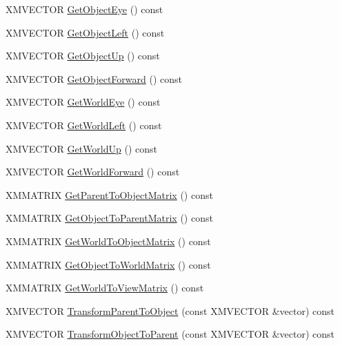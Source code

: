 \begin{DoxyCompactItemize}
\item 
X\+M\+V\+E\+C\+T\+OR \hyperlink{structmage_1_1_transform_ac6808d885014b98c6920f8a770d3c7d4}{Get\+Object\+Eye} () const
\item 
X\+M\+V\+E\+C\+T\+OR \hyperlink{structmage_1_1_transform_a12946ff32c7044889f7c89c9182dba76}{Get\+Object\+Left} () const
\item 
X\+M\+V\+E\+C\+T\+OR \hyperlink{structmage_1_1_transform_a68a9a599104b976b01aea39cc8ab03d2}{Get\+Object\+Up} () const
\item 
X\+M\+V\+E\+C\+T\+OR \hyperlink{structmage_1_1_transform_affc4bcfe6ca76005db8676de867aede0}{Get\+Object\+Forward} () const
\item 
X\+M\+V\+E\+C\+T\+OR \hyperlink{structmage_1_1_transform_a41ba0976f707bc9bcfa646e53d7e9507}{Get\+World\+Eye} () const
\item 
X\+M\+V\+E\+C\+T\+OR \hyperlink{structmage_1_1_transform_aef18a0e685f56ce4a805b2fef57287f6}{Get\+World\+Left} () const
\item 
X\+M\+V\+E\+C\+T\+OR \hyperlink{structmage_1_1_transform_af28786b745a144eef74d69a55055b00a}{Get\+World\+Up} () const
\item 
X\+M\+V\+E\+C\+T\+OR \hyperlink{structmage_1_1_transform_a24bd3a710a3c0bde7a6d2f2de56a315c}{Get\+World\+Forward} () const
\item 
X\+M\+M\+A\+T\+R\+IX \hyperlink{structmage_1_1_transform_a66eee9c51ff050924d35c3747083593f}{Get\+Parent\+To\+Object\+Matrix} () const
\item 
X\+M\+M\+A\+T\+R\+IX \hyperlink{structmage_1_1_transform_a8da2bed8599b4f012ac85af9d76c7f37}{Get\+Object\+To\+Parent\+Matrix} () const
\item 
X\+M\+M\+A\+T\+R\+IX \hyperlink{structmage_1_1_transform_a773c1db9e475deb6d9f446a88cfae30f}{Get\+World\+To\+Object\+Matrix} () const
\item 
X\+M\+M\+A\+T\+R\+IX \hyperlink{structmage_1_1_transform_a6fe97738bf9ae9d1e677c3e09b8c6d81}{Get\+Object\+To\+World\+Matrix} () const
\item 
X\+M\+M\+A\+T\+R\+IX \hyperlink{structmage_1_1_transform_a33cc590d779f69044d183bab653bd260}{Get\+World\+To\+View\+Matrix} () const
\item 
X\+M\+V\+E\+C\+T\+OR \hyperlink{structmage_1_1_transform_ae218925fd8223d25d2532ac96722d8a0}{Transform\+Parent\+To\+Object} (const X\+M\+V\+E\+C\+T\+OR \&vector) const
\item 
X\+M\+V\+E\+C\+T\+OR \hyperlink{structmage_1_1_transform_af59658a7bd8f86961449e35b005c9c83}{Transform\+Object\+To\+Parent} (const X\+M\+V\+E\+C\+T\+OR \&vector) const

\end{DoxyCompactItemize}
